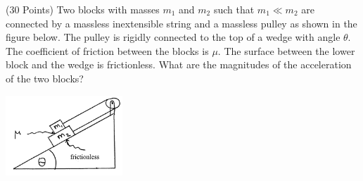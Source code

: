 \documentclass{esg8012exam}
\begin{document}
\begin{problem}{(30 Points)}
  Two blocks with masses $m_1$ and $m_2$ such that $m_1 \ll m_2$ are connected by a massless inextensible string and a massless pulley as shown in the figure below.  The pulley is rigidly connected to the top of a wedge with angle $\theta$.  The coefficient of friction between the blocks is $\mu$.  The surface between the lower block and the wedge is frictionless.  What are the magnitudes of the acceleration of the two blocks?
  \begin{center}\includegraphics[width=0.33\textwidth]{exam1_p2_1}\end{center}
\end{problem}
\end{document}

